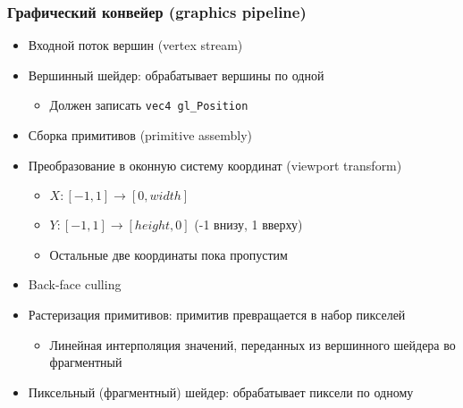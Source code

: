 \documentclass{beamer}
\begin{document}
\begin{frame}[fragile]
\frametitle{Графический конвейер (graphics pipeline)}
\begin{itemize}
\pause
\item Входной поток вершин (vertex stream)
\pause
\item Вершинный шейдер: обрабатывает вершины по одной
\begin{itemize}
\item Должен записать \verb|vec4 gl_Position|
\end{itemize}
\pause
\item Сборка примитивов (primitive assembly)
\pause
\item Преобразование в оконную систему координат (viewport transform)
\begin{itemize}
\item \begin{math}X: [-1, 1] \rightarrow [0, width]\end{math}
\item \begin{math}Y: [-1, 1] \rightarrow [height, 0]\end{math} (-1 внизу, 1 вверху)
\item Остальные две координаты пока пропустим
\end{itemize}
\pause
\item Back-face culling
\pause
\item Растеризация примитивов: примитив превращается в набор пикселей
\begin{itemize}
\item Линейная интерполяция значений, переданных из вершинного шейдера во фрагментный
\end{itemize}
\pause
\item Пиксельный (фрагментный) шейдер: обрабатывает пиксели по одному
\end{itemize}
\end{frame}
\end{document}
